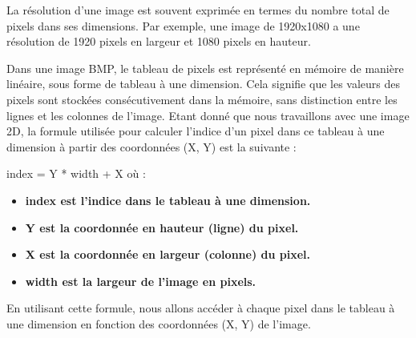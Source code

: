 \documentclass{article}
\begin{document}
La résolution d'une image est souvent exprimée en termes du nombre total de pixels dans ses dimensions. Par exemple, une image de 1920x1080 a une résolution de 1920 pixels en largeur et 1080 pixels en hauteur.

Dans une image BMP, le tableau de pixels est représenté en mémoire de manière linéaire, sous forme de tableau à une dimension. Cela signifie que les valeurs des pixels sont stockées consécutivement dans la mémoire, sans distinction entre les lignes et les colonnes de l'image. Etant donné que nous travaillons avec une image 2D, la formule utilisée pour calculer l'indice d'un pixel dans ce tableau à une dimension à partir des coordonnées (X, Y) est la suivante :\
\bfseries \begin{center}
    index = Y * width + X \normalfont où :
\end{center}
\begin{itemize}
\item \bfseries index \normalfont est l'indice dans le tableau à une dimension.
\item \bfseries Y \normalfont est la coordonnée en hauteur (ligne) du pixel.
\item \bfseries X \normalfont  est la coordonnée en largeur (colonne) du pixel.
\item \bfseries width \normalfont  est la largeur de l'image en pixels.
\end{itemize}

\normalfont En utilisant cette formule, nous allons accéder à chaque pixel dans le tableau à une dimension en fonction des coordonnées (X, Y) de l'image.
\end{document}
